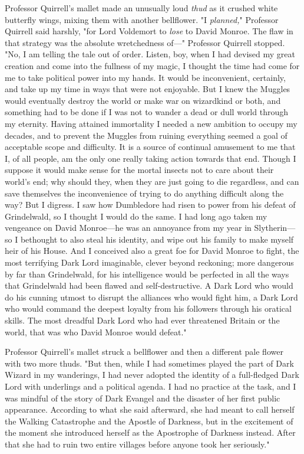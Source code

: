 Professor Quirrell's mallet made an unusually loud \emph{thud} as it crushed 
white butterfly wings, mixing them with another bellflower. "I \emph{planned,}" 
Professor Quirrell said harshly, "for Lord Voldemort to \emph{lose} to David 
Monroe. The flaw in that strategy was the absolute wretchedness of---" 
Professor Quirrell stopped. "No, I am telling the tale out of order. Listen, 
boy, when I had devised my great creation and come into the fullness of my 
magic, I thought the time had come for me to take political power into my 
hands. It would be inconvenient, certainly, and take up my time in ways that 
were not enjoyable. But I knew the Muggles would eventually destroy the world 
or make war on wizardkind or both, and something had to be done if I was not to 
wander a dead or dull world through my eternity. Having attained immortality I 
needed a new ambition to occupy my decades, and to prevent the Muggles from 
ruining everything seemed a goal of acceptable scope and difficulty. It is a 
source of continual amusement to me that I, of all people, am the only one 
really taking action towards that end. Though I suppose it would make sense for 
the mortal insects not to care about their world's end; why should they, when 
they are just going to die regardless, and can save themselves the 
inconvenience of trying to do anything difficult along the way? But I digress. 
I saw how Dumbledore had risen to power from his defeat of Grindelwald, so I 
thought I would do the same. I had long ago taken my vengeance on David 
Monroe---he was an annoyance from my year in Slytherin---so I bethought to also 
steal his identity, and wipe out his family to make myself heir of his House. 
And I conceived also a great foe for David Monroe to fight, the most terrifying 
Dark Lord imaginable, clever beyond reckoning; more dangerous by far than 
Grindelwald, for his intelligence would be perfected in all the ways that 
Grindelwald had been flawed and self-destructive. A Dark Lord who would do his 
cunning utmost to disrupt the alliances who would fight him, a Dark Lord who 
would command the deepest loyalty from his followers through his oratical 
skills. The most dreadful Dark Lord who had ever threatened Britain or the 
world, that was who David Monroe would defeat."

Professor Quirrell's mallet struck a bellflower and then a different pale 
flower with two more thuds. "But then, while I had sometimes played the part of 
Dark Wizard in my wanderings, I had never adopted the identity of a 
full-fledged Dark Lord with underlings and a political agenda. I had no 
practice at the task, and I was mindful of the story of Dark Evangel and the 
disaster of her first public appearance. According to what she said afterward, 
she had meant to call herself the Walking Catastrophe and the Apostle of 
Darkness, but in the excitement of the moment she introduced herself as the 
Apostrophe of Darkness instead. After that she had to ruin two entire villages 
before anyone took her seriously."

